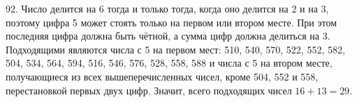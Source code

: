 92. Число делится на 6 тогда и только тогда, когда оно делится на 2 и на 3, поэтому цифра 5 может стоять только на первом или втором месте. При этом последняя цифра должна быть чётной, а сумма цифр должна делиться на 3. Подходящими являются числа с 5 на первом мест: 510, 540, 570, 522, 552, 582, 504, 534, 564, 594, 516, 546, 576, 528, 558, 588 и числа с 5 на втором месте, получающиеся из всех вышеперечисленных чисел, кроме 504, 552 и 558, перестановкой первых двух цифр. Значит, всего подходящих чисел $16+13=29.$\\
